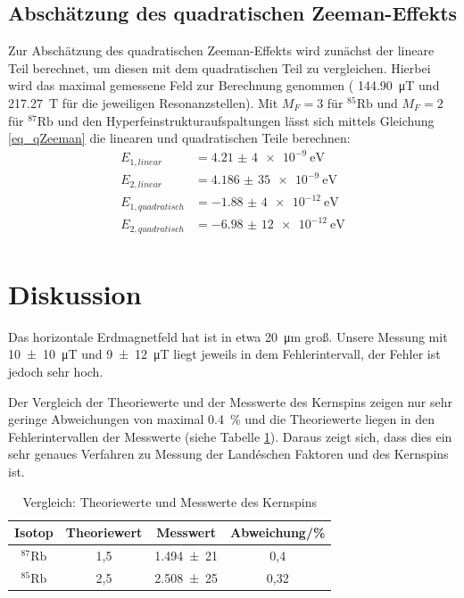 \subsection{Abschätzung des quadratischen Zeeman-Effekts}
Zur Abschätzung des quadratischen Zeeman-Effekts wird zunächst der lineare Teil
berechnet, um diesen mit dem quadratischen Teil zu vergleichen. Hierbei wird das
maximal gemessene Feld zur Berechnung genommen ( \SI{144,90}{\micro\tesla} und
\SI{217,27}{\tesla} für die jeweiligen Resonanzstellen). Mit $M_F=3$ für
$^{85}\text{Rb}$ und $M_F=2$ für $^{87}\text{Rb}$ und den
Hyperfeinstrukturaufspaltungen \cite{Q1} lässt sich mittels Gleichung \eqref{eq_qZeeman}
die linearen und quadratischen Teile berechnen:
\begin{align*}
  E_{1, linear} &= \SI{4,21(4)e-9}{\eV} \\
  E_{2, linear} &= \SI{4,186(35)e-9}{\eV} \\
  E_{1, quadratisch} &= \SI{-1,88(4)e-12}{\eV} \\
  E_{2, quadratisch} &= \SI{-6,98(12)e-12}{\eV} \\
\end{align*}

\section{Diskussion}
Das horizontale Erdmagnetfeld hat ist in etwa \SI{20}{\micro\meter} groß.
Unsere Messung mit \SI{10(10)}{\micro\tesla} und \SI{9(12)}{\micro\tesla}
liegt jeweils in dem Fehlerintervall, der Fehler ist jedoch sehr hoch.

Der Vergleich der Theoriewerte und der Messwerte des Kernspins zeigen nur sehr
geringe Abweichungen von maximal \SI{0,4}{\percent} und die Theoriewerte liegen
in den Fehlerintervallen der Messwerte (siehe Tabelle \ref{tab:diskussion}).
Daraus zeigt sich, dass dies ein sehr genaues Verfahren zu Messung der
Landéschen Faktoren und des Kernspins ist.

\begin{table}
  \centering
  \caption{Vergleich: Theoriewerte und Messwerte des Kernspins}
  \label{tab:diskussion}
  \begin{tabular}{c| c c c}
    \toprule
    Isotop & Theoriewert & Messwert & Abweichung/\si{\percent}\\
    \midrule
    $^{87}\text{Rb}$ & 1,5 &  \num{1,494(21)} & 0,4 \\
    $^{85}\text{Rb}$ & 2,5 &  \num{2,508(25)} & 0,32 \\
    \bottomrule
  \end{tabular}
\end{table}

